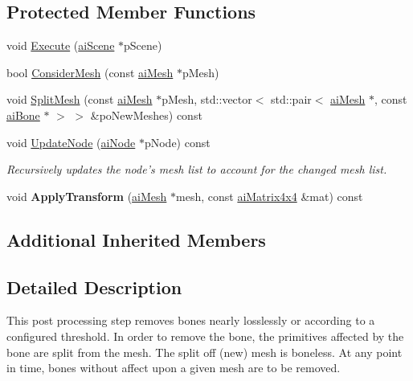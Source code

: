 \subsection*{Protected Member Functions}
\begin{DoxyCompactItemize}
\item 
void \hyperlink{class_assimp_1_1_debone_process_a3889723a333e0eb1874131efb0e8de34}{Execute} (\hyperlink{structai_scene}{ai\+Scene} $\ast$p\+Scene)
\item 
bool \hyperlink{class_assimp_1_1_debone_process_ab1f536da62ce1d50737b48a4dae095e8}{Consider\+Mesh} (const \hyperlink{structai_mesh}{ai\+Mesh} $\ast$p\+Mesh)
\item 
void \hyperlink{class_assimp_1_1_debone_process_a68abdf4149da4e64846b20c0aee1dad3}{Split\+Mesh} (const \hyperlink{structai_mesh}{ai\+Mesh} $\ast$p\+Mesh, std\+::vector$<$ std\+::pair$<$ \hyperlink{structai_mesh}{ai\+Mesh} $\ast$, const \hyperlink{structai_bone}{ai\+Bone} $\ast$ $>$ $>$ \&po\+New\+Meshes) const 
\item 
\hypertarget{class_assimp_1_1_debone_process_a6457dc91b31b2f0293491522777e0567}{void \hyperlink{class_assimp_1_1_debone_process_a6457dc91b31b2f0293491522777e0567}{Update\+Node} (\hyperlink{structai_node}{ai\+Node} $\ast$p\+Node) const }\label{class_assimp_1_1_debone_process_a6457dc91b31b2f0293491522777e0567}

\begin{DoxyCompactList}\small\item\em Recursively updates the node's mesh list to account for the changed mesh list. \end{DoxyCompactList}\item 
\hypertarget{class_assimp_1_1_debone_process_affedab4adedda090e2afa27826c7662b}{void {\bfseries Apply\+Transform} (\hyperlink{structai_mesh}{ai\+Mesh} $\ast$mesh, const \hyperlink{structai_matrix4x4}{ai\+Matrix4x4} \&mat) const }\label{class_assimp_1_1_debone_process_affedab4adedda090e2afa27826c7662b}

\end{DoxyCompactItemize}
\subsection*{Additional Inherited Members}


\subsection{Detailed Description}
This post processing step removes bones nearly losslessly or according to a configured threshold. In order to remove the bone, the primitives affected by the bone are split from the mesh. The split off (new) mesh is boneless. At any point in time, bones without affect upon a given mesh are to be removed. 

